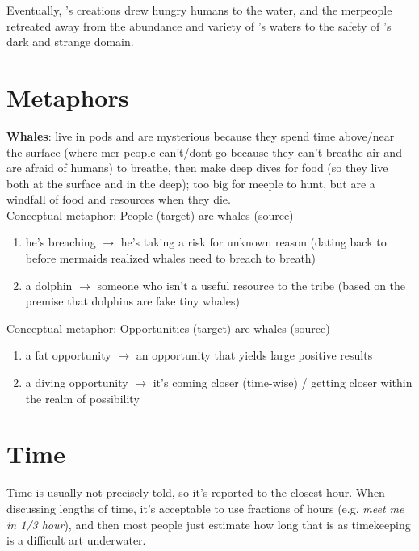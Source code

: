\documentclass[11pt]{report}
\begin{document}
Eventually, 's creations drew hungry humans to the water, and the merpeople retreated away from the abundance and variety of 's waters to the safety of 's dark and strange domain.

\section{Metaphors}
\textbf{Whales}:  live in pods and are mysterious because they spend time above/near the surface (where mer-people can't/dont go because they can't breathe air and are afraid of humans) to breathe, then make deep dives for food (so they live both at the surface and in the deep); too big for meeple to hunt, but are a windfall of food and resources when they die. \\

Conceptual metaphor: People (target) are whales (source)
\begin{enumerate}
	\item he's breaching $\rightarrow$ he's taking a risk for unknown reason (dating back to before mermaids realized whales need to breach to breath) 
	\item a dolphin $\rightarrow$ someone who isn't a useful resource to the tribe (based on the premise that dolphins are fake tiny whales)
\end{enumerate}

Conceptual metaphor: Opportunities (target) are whales (source)
\begin{enumerate}
	\item a fat opportunity $\rightarrow$ an opportunity that yields large positive results
	\item a diving opportunity $\rightarrow$ it's coming closer (time-wise) / getting closer within the realm of possibility
\end{enumerate}


\section{Time}
Time is usually not precisely told, so it's reported to the closest hour.  When discussing lengths of time, it's acceptable to use fractions of hours (e.g. \textit{meet me in 1/3 hour}), and then most people just estimate how long that is as timekeeping is a difficult art underwater.
\end{document}
